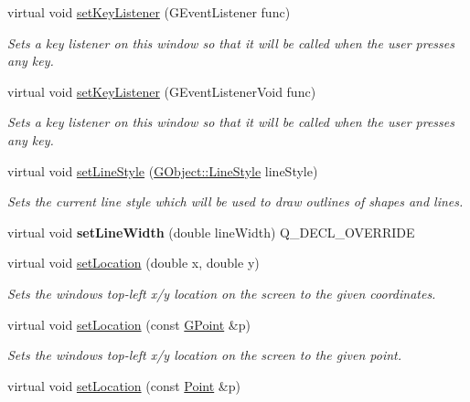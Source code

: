 \begin{DoxyCompactItemize}
virtual void \mbox{\hyperlink{classGWindow_aeb8324d3287fa1fbe093f4d6230cf0a6}{set\+Key\+Listener}} (G\+Event\+Listener func)
\begin{DoxyCompactList}\small\item\em Sets a key listener on this window so that it will be called when the user presses any key. \end{DoxyCompactList}\item 
virtual void \mbox{\hyperlink{classGWindow_ae48ecea73606c7bd9423e1c7cc589cc9}{set\+Key\+Listener}} (G\+Event\+Listener\+Void func)
\begin{DoxyCompactList}\small\item\em Sets a key listener on this window so that it will be called when the user presses any key. \end{DoxyCompactList}\item 
virtual void \mbox{\hyperlink{classGDrawingSurface_a6bfe14a77101db0fb97b5a7e07a5526b}{set\+Line\+Style}} (\mbox{\hyperlink{classGObject_a86e0f5648542856159bb40775c854aa7}{G\+Object\+::\+Line\+Style}} line\+Style)
\begin{DoxyCompactList}\small\item\em Sets the current line style which will be used to draw outlines of shapes and lines. \end{DoxyCompactList}\item 
virtual void {\bfseries set\+Line\+Width} (double line\+Width) Q\+\_\+\+D\+E\+C\+L\+\_\+\+O\+V\+E\+R\+R\+I\+DE
\item 
virtual void \mbox{\hyperlink{classGWindow_a04594e8ba9b98513a64f1da00dcae18c}{set\+Location}} (double x, double y)
\begin{DoxyCompactList}\small\item\em Sets the window\textquotesingle{}s top-\/left x/y location on the screen to the given coordinates. \end{DoxyCompactList}\item 
virtual void \mbox{\hyperlink{classGWindow_a6ef8e1a904fffe55052f7a22f8552e4b}{set\+Location}} (const \mbox{\hyperlink{classGPoint}{G\+Point}} \&p)
\begin{DoxyCompactList}\small\item\em Sets the window\textquotesingle{}s top-\/left x/y location on the screen to the given point. \end{DoxyCompactList}\item 
virtual void \mbox{\hyperlink{classGWindow_a87e01677a5e66337a16b60524e3796ab}{set\+Location}} (const \mbox{\hyperlink{classPoint}{Point}} \&p)

\end{DoxyCompactItemize}
